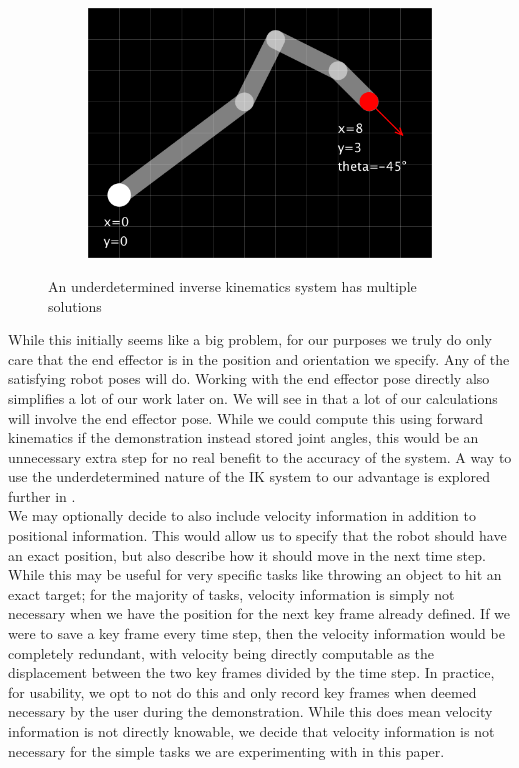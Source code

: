 \begin{figure}[h]
\begin{subfigure}[b]{0.32\textwidth}
        \includegraphics[width=\textwidth]{figures/ik_multi-3.png}
    \end{subfigure}
    \caption{An underdetermined inverse kinematics system has multiple solutions}
    \label{fig:underdetermined}
\end{figure}

While this initially seems like a big problem, for our purposes we truly do only care that the end effector is in the position and orientation we specify. Any of the satisfying robot poses will do. Working with the end effector pose directly also simplifies a lot of our work later on. We will see in  that a lot of our calculations will involve the end effector pose. While we could compute this using forward kinematics if the demonstration instead stored joint angles, this would be an unnecessary extra step for no real benefit to the accuracy of the system. A way to use the underdetermined nature of the IK system to our advantage is explored further in .\\

We may optionally decide to also include velocity information in addition to positional information. This would allow us to specify that the robot should have an exact position, but also describe how it should move in the next time step. While this may be useful for very specific tasks like throwing an object to hit an exact target; for the majority of tasks, velocity information is simply not necessary when we have the position for the next key frame already defined. If we were to save a key frame every time step, then the velocity information would be completely redundant, with velocity being directly computable as the displacement between the two key frames divided by the time step. In practice, for usability, we opt to not do this and only record key frames when deemed necessary by the user during the demonstration. While this does mean velocity information is not directly knowable, we decide that velocity information is not necessary for the simple tasks we are experimenting with in this paper.\\

